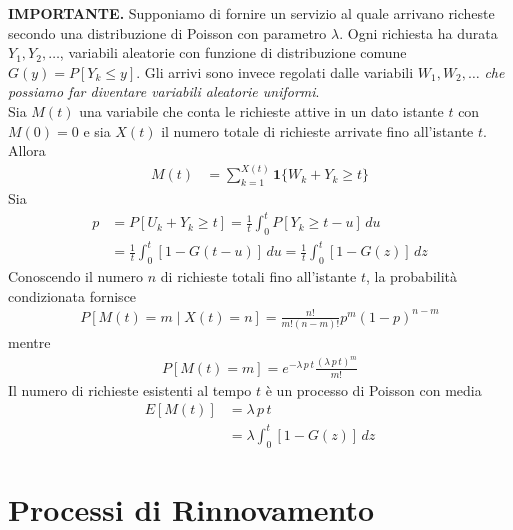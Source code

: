 \documentclass{article}
\begin{document}
\begin{boxedminipage}{\textwidth}
\textbf{IMPORTANTE.} Supponiamo di fornire un servizio al quale arrivano richeste secondo una distribuzione di Poisson con parametro $\lambda$. Ogni richiesta ha durata $Y_1,Y_2,\hdots$, variabili aleatorie con funzione di distribuzione comune $G(y) = P[Y_k \le y]$. Gli arrivi sono invece regolati dalle variabili $W_1,W_2,\hdots$ \textit{che possiamo far diventare variabili aleatorie uniformi}.\\
Sia $M(t)$ una variabile che conta le richieste attive in un dato istante $t$ con $M(0) = 0$ e sia $X(t)$ il numero totale di richieste arrivate fino all'istante $t$. Allora
\begin{align*}
M(t) &= \sum_{k=1}^{X(t)} \textbf{1}\{W_k + Y_k \ge t\}
\end{align*}
Sia
\begin{align*}
p &= P[U_k + Y_k \ge t] = \frac{1}{t}\int_0^t P[Y_k \ge t - u]\,du\\
&= \frac{1}{t}\int_0^t [1-G(t-u)]\,du = \frac{1}{t} \int_0^t [1-G(z)]\,dz
\end{align*}
Conoscendo il numero $n$ di richieste totali fino all'istante $t$, la probabilità condizionata fornisce
\begin{align*}
P[M(t) = m \mid X(t) = n] = \frac{n!}{m!(n-m)!} p^m (1-p)^{n-m}
\end{align*}
mentre
\begin{align*}
P[M(t) = m] = e^{-\lambda\,p\,t}\frac{(\lambda\,p\,t)^m}{m!}
\end{align*}
Il numero di richieste esistenti al tempo $t$ è un processo di Poisson con media
\begin{align*}
E[M(t)] &= \lambda\,p\,t\\
&= \lambda \int_0^t [1-G(z)]\,dz
\end{align*}
\end{boxedminipage}


\newpage
\section{Processi di Rinnovamento}
\end{document}
